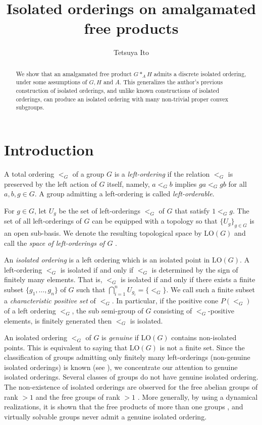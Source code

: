 \documentclass[10pt]{amsart}
\title{Isolated orderings on amalgamated free products}
\author{Tetsuya Ito}
\numberwithin{equation}{section}
\begin{document}
\maketitle

\begin{abstract}
We show that an amalgamated free product $G*_{A}H$ admits a discrete isolated ordering, under some assumptions of $G,H$ and $A$. This generalizes the author's previous construction of isolated orderings, and unlike known constructions of isolated orderings, can produce an isolated ordering with many non-trivial proper convex subgroups.
\end{abstract}

\section{Introduction}

A total ordering $<_{G}$ of a group $G$ is a \emph{left-ordering} if the relation $<_{G}$ is preserved by the left action of $G$ itself, namely, $a<_{G} b$ implies $ga <_{G} gb$ for all $a,b,g \in G$. A group admitting a left-ordering is called \emph{left-orderable}.  

For $g \in G$, let $U_{g}$ be the set of left-orderings $<_{G}$ of $G$ that satisfy $1<_{G} g$. The set of all left-orderings of $G$ can be equipped with a topology so that $\{U_{g}\}_{g \in G}$ is an open sub-basis. We denote the resulting topological space by ${\textrm{LO}}(G)$ and call the \emph{space of left-orderings of $G$} \cite{si}.
 

An \emph{isolated ordering} is a left ordering which is an isolated point in ${\textrm{LO}}(G)$. A left-ordering $<_{G}$ is isolated if and only if $<_{G}$ is determined by the sign of finitely many elements. That is, $<_{G}$ is isolated if and only if there exists a finite subset $\{g_1,\ldots,g_{n}\}$ of $G$ such that $\bigcap_{i=1}^{n} U_{g_i} =\{<_{G}\}$. We call such a finite subset a \emph{characteristic positive set} of $<_{G}$. 
In particular, if the positive cone $P(<_{G})$ of a left ordering $<_{G}$, the sub semi-group of $G$ consisting of $<_{G}$-positive elements, is finitely generated then $<_{G}$ is isolated.

An isolated ordering $<_{G}$ of $G$ is \emph{genuine} if ${\textrm{LO}}(G)$ contains non-isolated points. This is equivalent to saying that ${\textrm{LO}}(G)$ is not a finite set. Since the classification of groups admitting only finitely many left-orderings (non-genuine isolated orderings) is known (see \cite[Theorem 5.2.1]{km}), we concentrate our attention to genuine isolated orderings. 
Several classes of groups do not have genuine isolated ordering.
The non-existence of isolated orderings are observed for the free abelian groups of rank $>1$ \cite{si} and the free groups of rank $>1$ \cite{n1}. More generally, by using a dynamical realizations, it is shown that the free products of more than one groups \cite{ri}, and virtually solvable groups \cite{rt} never admit a genuine isolated ordering.
\end{document}
